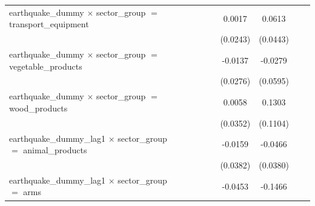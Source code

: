 \begin{tabular}{lcccccccc}
   earthquake\_dummy $\times$ sector\_group $=$ transport\_equipment              &                       &                       &                       &                       & 0.0017                & 0.0613                &                       &   \\   
                                                                                  &                       &                       &                       &                       & (0.0243)              & (0.0443)              &                       &   \\   
   earthquake\_dummy $\times$ sector\_group $=$ vegetable\_products               &                       &                       &                       &                       & -0.0137               & -0.0279               &                       &   \\   
                                                                                  &                       &                       &                       &                       & (0.0276)              & (0.0595)              &                       &   \\   
   earthquake\_dummy $\times$ sector\_group $=$ wood\_products                    &                       &                       &                       &                       & 0.0058                & 0.1303                &                       &   \\   
                                                                                  &                       &                       &                       &                       & (0.0352)              & (0.1104)              &                       &   \\   
   earthquake\_dummy\_lag1 $\times$ sector\_group $=$ animal\_products            &                       &                       &                       &                       & -0.0159               & -0.0466               &                       &   \\   
                                                                                  &                       &                       &                       &                       & (0.0382)              & (0.0380)              &                       &   \\   
   earthquake\_dummy\_lag1 $\times$ sector\_group $=$ arms                        &                       &                       &                       &                       & -0.0453               & -0.1466               &                       &   \\   

\end{tabular}
